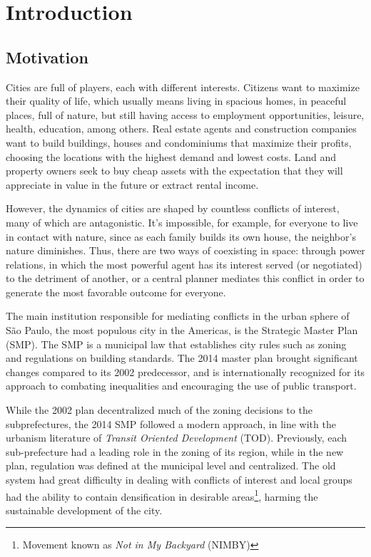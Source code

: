 \chapter{Introduction}

\section{Motivation}
\label{sec:motivation}

Cities are full of players, each with different interests. Citizens want to maximize their quality of life, which usually means living in spacious homes, in peaceful places, full of nature, but still having access to employment opportunities, leisure, health, education, among others. Real estate agents and construction companies want to build buildings, houses and condominiums that maximize their profits, choosing the locations with the highest demand and lowest costs. Land and property owners seek to buy cheap assets with the expectation that they will appreciate in value in the future or extract rental income.

However, the dynamics of cities are shaped by countless conflicts of interest, many of which are antagonistic. It's impossible, for example, for everyone to live in contact with nature, since as each family builds its own house, the neighbor's nature diminishes. Thus, there are two ways of coexisting in space: through power relations, in which the most powerful agent has its interest served (or negotiated) to the detriment of another, or a central planner mediates this conflict in order to generate the most favorable outcome for everyone.

The main institution responsible for mediating conflicts in the urban sphere of São Paulo, the most populous city in the Americas, is the Strategic Master Plan (SMP). The SMP is a municipal law that establishes city rules such as zoning and regulations on building standards. The 2014 master plan brought significant changes compared to its 2002 predecessor, and is internationally recognized for its approach to combating inequalities and encouraging the use of public transport.

While the 2002 plan decentralized much of the zoning decisions to the subprefectures, the 2014 SMP followed a modern approach, in line with the urbanism literature of \textit{Transit Oriented Development} (TOD). Previously, each sub-prefecture had a leading role in the zoning of its region, while in the new plan, regulation was defined at the municipal level and centralized. The old system had great difficulty in dealing with conflicts of interest and local groups had the ability to contain densification in desirable areas\footnote{Movement known as \textit{Not in My Backyard} (NIMBY)}, harming the sustainable development of the city.

